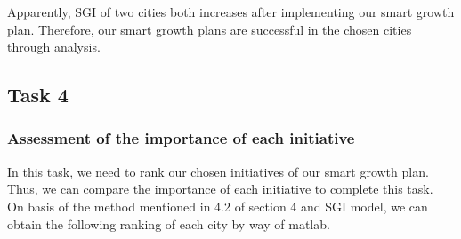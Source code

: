 \documentclass{mcmthesis}
\begin{document}
\noindent Apparently, SGI of two cities both increases after implementing our smart growth plan. Therefore, our smart growth plans are successful in the chosen cities through analysis.\\
\newpage
\subsection{Task 4}%
\subsubsection{Assessment of the importance of each initiative}%
In this task, we need to rank our chosen initiatives of our smart growth plan. Thus, we can compare the importance of each initiative to complete this task.\\
On basis of the method mentioned in 4.2 of section 4 and SGI model, we can obtain the   following ranking of each city by way of matlab.\\
\end{document}
